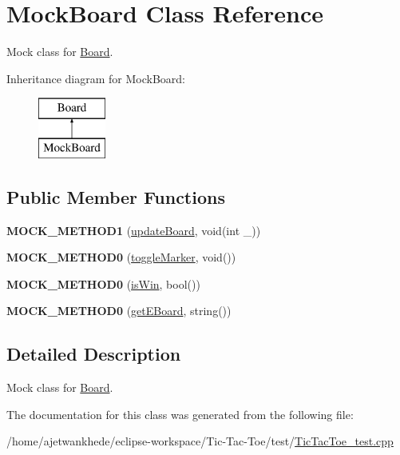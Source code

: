 \hypertarget{classMockBoard}{}\section{Mock\+Board Class Reference}
\label{classMockBoard}


Mock class for \mbox{\hyperlink{classBoard}{Board}}.  


Inheritance diagram for Mock\+Board\+:\begin{figure}[H]
\begin{center}
\leavevmode
\includegraphics[height=2.000000cm]{classMockBoard}
\end{center}
\end{figure}
\subsection*{Public Member Functions}
\begin{DoxyCompactItemize}
\item 
\mbox{\label{classMockBoard_a57e597fcd77beb5515b790ccd7fef046}} 
{\bfseries M\+O\+C\+K\+\_\+\+M\+E\+T\+H\+O\+D1} (\mbox{\hyperlink{classBoard_a44d5f45daeec9a19d48d17aa02601a17}{update\+Board}}, void(int \+\_\+))
\item 
\mbox{\label{classMockBoard_a85d4ebc748750df580b2fc9d8923cac3}} 
{\bfseries M\+O\+C\+K\+\_\+\+M\+E\+T\+H\+O\+D0} (\mbox{\hyperlink{classBoard_aca803d96c721292cedaf21b2ac5fb1a8}{toggle\+Marker}}, void())
\item 
\mbox{\label{classMockBoard_a0d0da2723c80205f275e1c9bd2225cc6}} 
{\bfseries M\+O\+C\+K\+\_\+\+M\+E\+T\+H\+O\+D0} (\mbox{\hyperlink{classBoard_ae59ed3d0322d92f9d9ae3ee6652e7268}{is\+Win}}, bool())
\item 
\mbox{\label{classMockBoard_ad2b162d253cfd9efbca2ad7cdb810111}} 
{\bfseries M\+O\+C\+K\+\_\+\+M\+E\+T\+H\+O\+D0} (\mbox{\hyperlink{classBoard_a3707ab499357d887c1be4e2bbb477891}{get\+E\+Board}}, string())
\end{DoxyCompactItemize}


\subsection{Detailed Description}
Mock class for \mbox{\hyperlink{classBoard}{Board}}. 

The documentation for this class was generated from the following file\+:\begin{DoxyCompactItemize}
\item 
/home/ajetwankhede/eclipse-\/workspace/\+Tic-\/\+Tac-\/\+Toe/test/\mbox{\hyperlink{TicTacToe__test_8cpp}{Tic\+Tac\+Toe\+\_\+test.\+cpp}}\end{DoxyCompactItemize}
